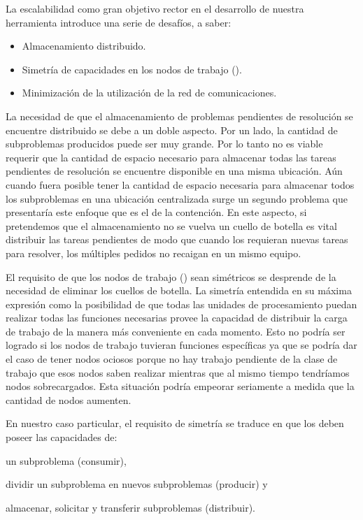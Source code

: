 La escalabilidad como gran objetivo rector en el desarrollo de nuestra
herramienta introduce una serie de desafíos, a saber:
\begin{itemize}
	\item Almacenamiento distribuido.
	\item Simetría de capacidades en los nodos de trabajo (\ws).
	\item Minimización de la utilización de la red de comunicaciones.
\end{itemize}

La necesidad de que el almacenamiento de problemas pendientes de resolución se
encuentre distribuido se debe a un doble aspecto. Por un lado, la cantidad de
subproblemas producidos puede ser muy grande. Por lo tanto no es viable
requerir que la cantidad de espacio necesario para almacenar todas las tareas
pendientes de resolución se encuentre disponible en una misma ubicación. Aún
cuando fuera posible tener la cantidad de espacio necesaria para almacenar
todos los subproblemas en una ubicación centralizada surge un segundo problema
que presentaría este enfoque que es el de la contención. En este aspecto, si
pretendemos que el almacenamiento no se vuelva un cuello de botella es vital
distribuir las tareas pendientes de modo que cuando los \ws requieran nuevas
tareas para resolver, los múltiples pedidos no recaigan en un mismo equipo.

El requisito de que los nodos de trabajo (\ws) sean simétricos se desprende de
la necesidad de eliminar los cuellos de botella. La simetría entendida en su
máxima expresión como la posibilidad de que todas las unidades de
procesamiento puedan realizar todas las funciones necesarias provee la
capacidad de distribuir la carga de trabajo de la manera más conveniente en
cada momento. Esto no podría ser logrado si los nodos de trabajo tuvieran
funciones específicas ya que se podría dar el caso de tener nodos ociosos
porque no hay trabajo pendiente de la clase de trabajo que esos nodos saben
realizar mientras que al mismo tiempo tendríamos nodos sobrecargados. Esta
situación podría empeorar seriamente a medida que la cantidad de nodos
aumenten.

En nuestro caso particular, el requisito de simetría se traduce en que los \ws
deben poseer las capacidades de: \begin{inparaenum}[a)] \item \solvear
{} un subproblema (consumir), \item
dividir un subproblema en nuevos subproblemas (producir) y \item almacenar,
solicitar y transferir subproblemas (distribuir). \end{inparaenum}

